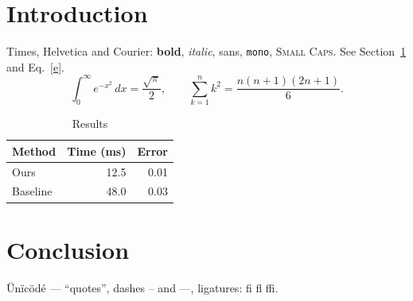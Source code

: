 \documentclass[preprint,12pt]{elsarticle}
\begin{document}
\begin{abstract}
We measure the effect of $\alpha$ on the rate $r(t)=r_0e^{-\lambda t}$ and report results in Table~\ref{t}.
\end{abstract}
\section{Introduction}\label{s}
Times, Helvetica and Courier: \textbf{bold}, \textit{italic}, \textsf{sans}, \texttt{mono}, \textsc{Small Caps}. See Section~\ref{s} and Eq.~\eqref{e}.
\begin{equation}\label{e}
\int_0^\infty e^{-x^2}\,dx=\frac{\sqrt\pi}{2},\qquad \sum_{k=1}^{n}k^2=\frac{n(n+1)(2n+1)}{6}.
\end{equation}
\begin{table}[t]\centering\caption{Results}\label{t}
\begin{tabular}{lrr}\hline Method & Time (ms) & Error\\\hline Ours & 12.5 & 0.01\\ Baseline & 48.0 & 0.03\\\hline\end{tabular}
\end{table}
\section{Conclusion}
Ünïcödé — “quotes”, dashes -- and ---, ligatures: fi fl ffi.
\end{document}
